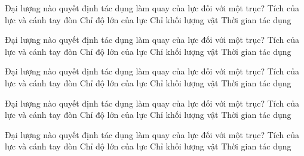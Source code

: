 

\begin{ex}
Đại lượng nào quyết định tác dụng làm quay của lực đối với một trục?
\choice
{\True Tích của lực và cánh tay đòn}
{Chỉ độ lớn của lực}
{Chỉ khối lượng vật}
{Thời gian tác dụng}
\end{ex}

\begin{ex}
Đại lượng nào quyết định tác dụng làm quay của lực đối với một trục?
\choice
{\True Tích của lực và cánh tay đòn}
{Chỉ độ lớn của lực}
{Chỉ khối lượng vật}
{Thời gian tác dụng}
\end{ex}

\begin{ex}
Đại lượng nào quyết định tác dụng làm quay của lực đối với một trục?
\choice
{\True Tích của lực và cánh tay đòn}
{Chỉ độ lớn của lực}
{Chỉ khối lượng vật}
{Thời gian tác dụng}
\end{ex}

\begin{ex}
Đại lượng nào quyết định tác dụng làm quay của lực đối với một trục?
\choice
{\True Tích của lực và cánh tay đòn}
{Chỉ độ lớn của lực}
{Chỉ khối lượng vật}
{Thời gian tác dụng}
\end{ex}

\begin{ex}
Đại lượng nào quyết định tác dụng làm quay của lực đối với một trục?
\choice
{\True Tích của lực và cánh tay đòn}
{Chỉ độ lớn của lực}
{Chỉ khối lượng vật}
{Thời gian tác dụng}
\end{ex}

